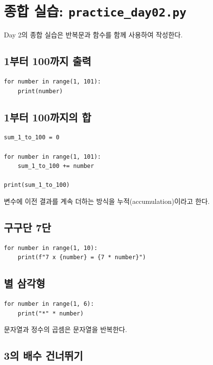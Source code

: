 \documentclass[11pt,a4paper]{article}
\begin{document}
\section{종합 실습: \texttt{practice\_day02.py}}

Day 2의 종합 실습은 반복문과 함수를 함께 사용하여 작성한다.

\subsection{1부터 100까지 출력}

\begin{lstlisting}
for number in range(1, 101):
    print(number)
\end{lstlisting}

\subsection{1부터 100까지의 합}

\begin{lstlisting}
sum_1_to_100 = 0

for number in range(1, 101):
    sum_1_to_100 += number

print(sum_1_to_100)
\end{lstlisting}

변수에 이전 결과를 계속 더하는 방식을 누적(accumulation)이라고 한다.

\subsection{구구단 7단}

\begin{lstlisting}
for number in range(1, 10):
    print(f"7 x {number} = {7 * number}")
\end{lstlisting}

\subsection{별 삼각형}

\begin{lstlisting}
for number in range(1, 6):
    print("*" * number)
\end{lstlisting}

문자열과 정수의 곱셈은 문자열을 반복한다.

\subsection{3의 배수 건너뛰기}
\end{document}

